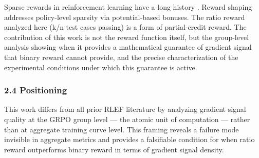 Sparse rewards in reinforcement learning have a long history \citep{Sutton2018RL}. Reward shaping \citep{Ng1999Shaping} addresses policy-level sparsity via potential-based bonuses. The ratio reward analyzed here (k/n test cases passing) is a form of partial-credit reward. The contribution of this work is not the reward function itself, but the group-level analysis showing when it provides a mathematical guarantee of gradient signal that binary reward cannot provide, and the precise characterization of the experimental conditions under which this guarantee is active.

\subsubsection{2.4 Positioning}

This work differs from all prior RLEF literature by analyzing gradient signal quality at the GRPO group level --- the atomic unit of computation --- rather than at aggregate training curve level. This framing reveals a failure mode invisible in aggregate metrics and provides a falsifiable condition for when ratio reward outperforms binary reward in terms of gradient signal density.

